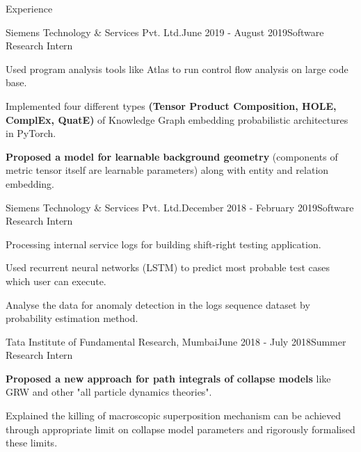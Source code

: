 \documentclass{resume} %
\begin{document}
\begin{rSection}{Experience}


\begin{rSubsection}{Siemens Technology \& Services Pvt. Ltd.}{June 2019 - August 2019}{Software Research Intern}{}
\item Used program analysis tools like Atlas to run control flow analysis on large code base.
\item Implemented four different types \textbf{(Tensor Product Composition, HOLE, ComplEx, QuatE)} of Knowledge Graph embedding probabilistic architectures in PyTorch.
\item \textbf{Proposed a model for learnable background geometry} (components of metric tensor itself are learnable parameters) along with entity and relation embedding.
\end{rSubsection}
\newpage
\begin{rSubsection}{Siemens Technology \& Services Pvt. Ltd.}{December 2018 - February 2019}{Software Research Intern}{}
\item Processing internal service logs for building shift-right testing application.
\item Used recurrent neural networks (LSTM) to predict most probable test cases which user can execute.
\item Analyse the data for anomaly detection in the logs sequence dataset by probability estimation method.
\end{rSubsection}

\begin{rSubsection}{Tata Institute of Fundamental Research, Mumbai}{June 2018 - July 2018}{Summer Research Intern}{}
\item  \textbf{Proposed a new approach for path integrals of collapse models} like GRW and other "all particle dynamics theories".
\item Explained the killing of macroscopic superposition mechanism can be achieved through appropriate limit on collapse model parameters and rigorously formalised these limits.
\end{rSubsection}

\end{rSection}
\end{document}
